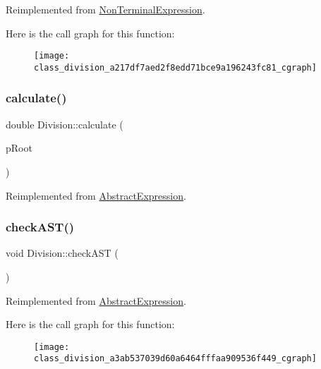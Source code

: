 Reimplemented from \mbox{\hyperlink{class_non_terminal_expression_aa65153b69523e01d86893f6d7b7fc480}{Non\+Terminal\+Expression}}.

Here is the call graph for this function\+:
\nopagebreak
\begin{figure}[H]
\begin{center}
\leavevmode
\texttt{[image: class\_division\_a217df7aed2f8edd71bce9a196243fc81\_cgraph]}
\end{center}
\end{figure}
\mbox{\label{class_division_a3b5308f2382926667d23c9fa8267480e}} 
\subsubsection{\texorpdfstring{calculate()}{calculate()}}
{\footnotesize\ttfamily double Division\+::calculate (\begin{DoxyParamCaption}\item[{std\+::unique\+\_\+ptr$<$ \mbox{\hyperlink{class_abstract_expression}{Abstract\+Expression}} $>$ \&}]{p\+Root }\end{DoxyParamCaption})\hspace{0.3cm}{\ttfamily [virtual]}}



Reimplemented from \mbox{\hyperlink{class_abstract_expression_a1c9871ee669668c2eb9f1f1a7d6f5d32}{Abstract\+Expression}}.

\mbox{\label{class_division_a3ab537039d60a6464fffaa909536f449}} 
\subsubsection{\texorpdfstring{checkAST()}{checkAST()}}
{\footnotesize\ttfamily void Division\+::check\+A\+ST (\begin{DoxyParamCaption}{ }\end{DoxyParamCaption})\hspace{0.3cm}{\ttfamily [virtual]}}



Reimplemented from \mbox{\hyperlink{class_abstract_expression_a703563fdf65d18ce4b7f2817e2ff4581}{Abstract\+Expression}}.

Here is the call graph for this function\+:
\nopagebreak
\begin{figure}[H]
\begin{center}
\leavevmode
\texttt{[image: class\_division\_a3ab537039d60a6464fffaa909536f449\_cgraph]}
\end{center}
\end{figure}
\mbox{\label{class_division_a98e3e9ebf0c3e305ba5d43b245f3815b}} 
